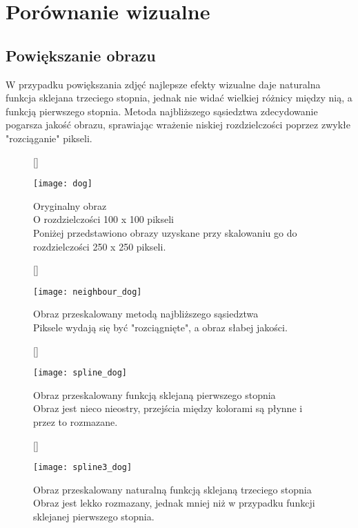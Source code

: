 \documentclass{mwart}
\theoremstyle{definition}
\begin{document}
\section{Porównanie wizualne}
\subsection{Powiększanie obrazu}

W przypadku powiększania zdjęć najlepsze efekty wizualne daje naturalna funkcja sklejana trzeciego stopnia, jednak nie widać wielkiej różnicy między nią, a funkcją pierwszego stopnia. Metoda najbliższego sąsiedztwa zdecydowanie pogarsza jakość obrazu, sprawiając wrażenie niskiej rozdzielczości poprzez zwykłe "rozciąganie" pikseli.

\begin{figure}[h!]
[\FBwidth]
{\caption*{Oryginalny obraz \\ O rozdzielczości 100 x 100 pikseli \\ Poniżej przedstawiono obrazy uzyskane przy skalowaniu go do rozdzielczości 250 x 250 pikseli.}\label{aa}}
{\texttt{[image: dog]}}
\end{figure}

\begin{figure}[h!]
[\FBwidth]
{\caption*{Obraz przeskalowany metodą najbliższego sąsiedztwa \\ Piksele wydają się być "rozciągnięte", a obraz słabej jakości.}\label{aa}}
{\texttt{[image: neighbour\_dog]}}
\end{figure}

\begin{figure}[h!]
[\FBwidth]
{\caption*{Obraz przeskalowany funkcją sklejaną pierwszego stopnia \\ Obraz jest nieco nieostry, przejścia między kolorami są płynne i przez to rozmazane.}\label{aa}}
{\texttt{[image: spline\_dog]}}
\end{figure}

\begin{figure}[h!]
[\FBwidth]
{\caption*{Obraz przeskalowany naturalną funkcją sklejaną trzeciego stopnia \\ Obraz jest lekko rozmazany, jednak mniej niż w przypadku funkcji sklejanej pierwszego stopnia. }\label{aa}}
{\texttt{[image: spline3\_dog]}}
\end{figure}
\end{document}
